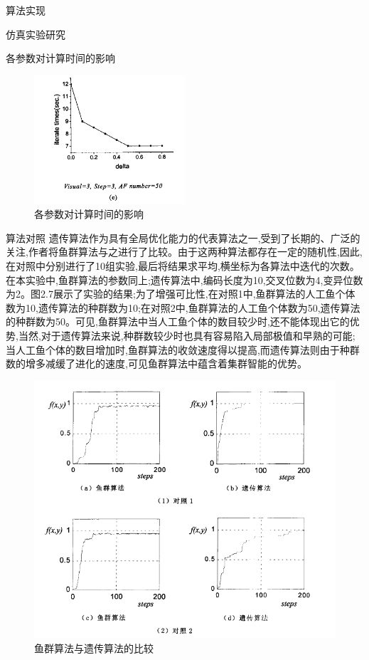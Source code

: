 \documentclass[UTF8]{ctexart}
\begin{document}
\begin{section}{算法实现}
\begin{subsection}{仿真实验研究}
\begin{subsubsection}{各参数对计算时间的影响}
\begin{figure}[H]
\end{figure}
\begin{figure}[H]\centering
\includegraphics[width=0.5\textwidth]{../../pic/fish8.png}
\caption{各参数对计算时间的影响}
\end{figure}
\end{subsubsection}
\end{subsection}

\begin{subsection}{算法对照}
遗传算法作为具有全局优化能力的代表算法之一,受到了长期的、广泛的关注,作者将鱼群算法与之进行了比较。由于这两种算法都存在一定的随机性,因此,在对照中分别进行了10组实验,最后将结果求平均,横坐标为各算法中迭代的次数。在本实验中,鱼群算法的参数同上;遗传算法中,编码长度为10,交叉位数为4,变异位数为2。图2.7展示了实验的结果;为了增强可比性,在对照1中,鱼群算法的人工鱼个体数为10,遗传算法的种群数为10;在对照2中,鱼群算法的人工鱼个体数为50,遗传算法的种群数为50。可见,鱼群算法中当人工鱼个体的数目较少时,还不能体现出它的优势,当然,对于遗传算法来说,种群数较少时也具有容易陷入局部极值和早熟的可能;当人工鱼个体的数目增加时,鱼群算法的收敛速度得以提高,而遗传算法则由于种群数的增多减缓了进化的速度,可见鱼群算法中蕴含着集群智能的优势。

\begin{figure}[H]\centering
\includegraphics[width=1.0\textwidth]{../../pic/fish14.png}
\caption{鱼群算法与遗传算法的比较}
\end{figure}
\end{subsection}


\end{section}
\end{document}
